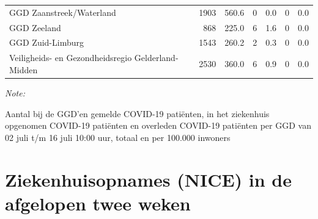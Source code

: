 \documentclass[
  english,
  man,floatsintext]{apa6}
\begin{document}
\begin{table}
\begin{threeparttable}
\begin{tabular}{lrrrrrr}
GGD Zaanstreek/Waterland & 1903 & 560.6 & 0 & 0.0 & 0 & 0.0\\
GGD Zeeland & 868 & 225.0 & 6 & 1.6 & 0 & 0.0\\
GGD Zuid-Limburg & 1543 & 260.2 & 2 & 0.3 & 0 & 0.0\\
Veiligheids- en Gezondheidsregio Gelderland-Midden & 2530 & 360.0 & 6 & 0.9 & 0 & 0.0\\
\bottomrule
\end{tabular}
\begin{tablenotes}
\item \textit{Note: } 
\item Aantal bij de GGD’en gemelde COVID-19 patiënten, in het ziekenhuis opgenomen COVID-19 patiënten en overleden COVID-19 patiënten per GGD van 02 juli t/m 16 juli 10:00 uur, totaal en per 100.000 inwoners
\end{tablenotes}
\end{threeparttable}
\endgroup{}
\end{table}

\newpage

\hypertarget{ziekenhuisopnames-nice-in-de-afgelopen-twee-weken}{%
\section{Ziekenhuisopnames (NICE) in de afgelopen twee weken}\label{ziekenhuisopnames-nice-in-de-afgelopen-twee-weken}}
\end{document}
